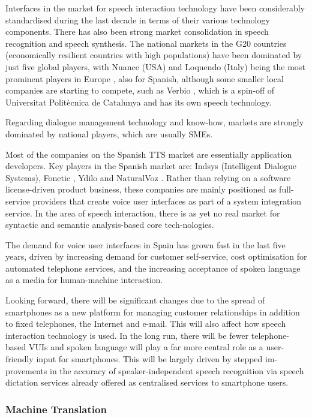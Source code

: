 \begin{multicols}{2}
Interfaces in the market for speech interaction technology have been considerably standardised during the last decade in terms of their various technology components. There has also been strong market consolidation in speech recognition and speech synthesis. The national markets in the G20 countries (economically resilient countries with high populations) have been dominated by just five global players, with Nuance (USA) and Loquendo (Italy) being the most prominent players in Europe , also for Spanish, although some smaller local companies are starting to compete, such as Verbio , which is a spin-off of Universitat Politècnica de Catalunya and has its own speech technology. 

Regarding dialogue management technology and know-how, markets are strongly dominated by national players, which are usually SMEs.

Most of the companies on the Spanish TTS market are essentially application developers. Key players in the Spanish market are: Indsys  (Intelligent Dialogue Systems), Fonetic , Ydilo  and NaturalVoz . Rather than relying on a software license-driven product business, these companies are mainly positioned as full-service providers that create voice user interfaces as part of a system integration service. In the area of speech interaction, there is as yet no real market for syntactic and semantic analysis-based core tech-nologies.

The demand for voice user interfaces in Spain has grown fast in the last five years, driven by increasing demand for customer self-service, cost optimisation for automated telephone services, and the increasing acceptance of spoken language as a media for human-machine interaction. 

Looking forward, there will be significant changes due to the spread of smartphones as a new platform for managing customer relationships in addition to fixed telephones, the Internet and e-mail. This will also affect how speech interaction technology is used. In the long run, there will be fewer telephone-based VUIs and spoken language will play a far more central role as a user-friendly input for smartphones. This will be largely driven by stepped im-provements in the accuracy of speaker-independent speech recognition via speech dictation services already offered as centralised services to smartphone users.

\subsubsection{Machine Translation}


\end{multicols}

